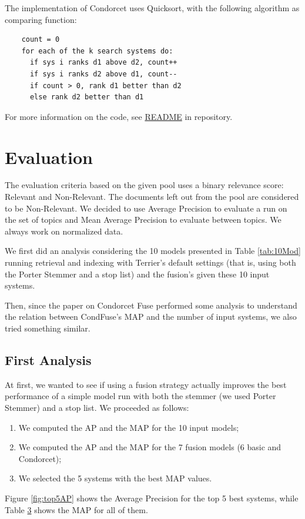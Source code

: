     The implementation of Condorcet uses Quicksort, with the following algorithm
	as comparing function:

	\begin{lstlisting}
	count = 0
	for each of the k search systems do:
	  if sys i ranks d1 above d2, count++
	  if sys i ranks d2 above d1, count--
	  if count > 0, rank d1 better than d2
	  else rank d2 better than d1
	\end{lstlisting}
	
	For more information on the code, see \href{https://github.com/annabonaldo/IRCondorcetFuse/blob/master/README.md}{README} in repository.

    \section{Evaluation}

	The evaluation criteria based on the given pool uses a binary relevance score:
	Relevant and Non-Relevant.
	The documents left out from the pool are considered to be Non-Relevant.
	We decided to use Average Precision to evaluate a run on the set of topics and Mean Average Precision to evaluate between topics. We always work on normalized data.
	
	We first did an analysis considering the 10 models presented in Table \ref{tab:10Mod} running retrieval and indexing with Terrier's default settings (that is, using both the Porter Stemmer and a stop list) and the fusion's given these 10 input systems.
	
	Then, since the paper on Condorcet Fuse performed some analysis to understand the relation between CondFuse's MAP and the number of input systems, we also tried something similar. 
	
	\subsection{First Analysis}
	At first, we wanted to see if using a fusion strategy actually improves the best performance of a simple model run with both the stemmer (we used Porter Stemmer) and a stop list.
	We proceeded as follows:
	\begin{enumerate}
		\item We computed the AP and the MAP for the 10 input models;
		\item We computed the AP and the MAP for the 7 fusion models (6 basic and Condorcet);
		\item We selected the 5 systems with the best MAP values.
	\end{enumerate}
	Figure \ref{fig:top5AP} shows the Average Precision for the top 5 best systems, while Table \hyperref[tab:17SysMAP]{3} shows the MAP for all of them.
	
